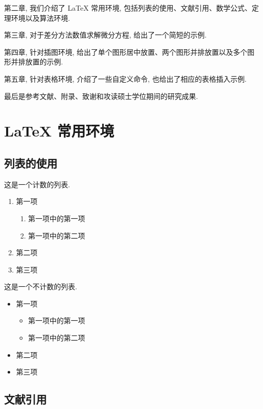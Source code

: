 \documentclass[UTF8,openany,twoside,12pt]{book}
\theoremstyle{plain}
\begin{document}
第二章, 我们介绍了 LaTeX 常用环境, 包括列表的使用、文献引用、数学公式、定理环境以及算法环境.

第三章, 对于差分方法数值求解微分方程, 给出了一个简短的示例.

第四章, 针对插图环境, 给出了单个图形居中放置、两个图形并排放置以及多个图形并排放置的示例.

第五章, 针对表格环境, 介绍了一些自定义命令, 也给出了相应的表格插入示例.

最后是参考文献、附录、致谢和攻读硕士学位期间的研究成果.




\chapter{LaTeX 常用环境}

\section{列表的使用}

这是一个计数的列表.
\begin{enumerate}%
	\item 第一项
		\begin{enumerate}
			\item 第一项中的第一项
			\item 第一项中的第二项
		\end{enumerate}
	\item 第二项
	\item 第三项
\end{enumerate}


这是一个不计数的列表.
\begin{itemize}%
	\item 第一项
	\begin{itemize}
		\item 第一项中的第一项
		\item 第一项中的第二项
	\end{itemize}
	\item 第二项
	\item 第三项
\end{itemize}


\section{文献引用}
\end{document}
